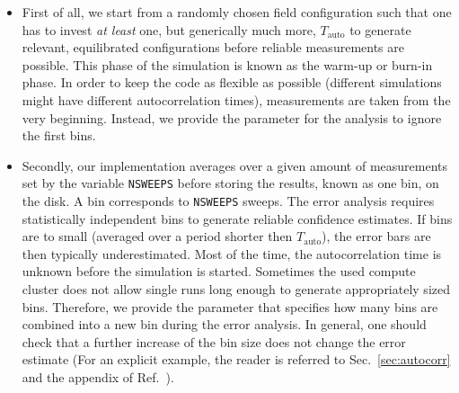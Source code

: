 \documentclass{SciPost}
\begin{document}
\begin{itemize}
	\item First of all, we start from a randomly chosen field configuration such that one has to invest \textit{at least}  one, but generically much more, $T_\mathrm{auto}$ to generate relevant, equilibrated configurations before reliable measurements are possible. This phase of the simulation is known as the warm-up or burn-in phase. In order to keep the code as flexible as possible (different simulations might have different autocorrelation times), measurements are taken from the very beginning. Instead, we provide the parameter  for the analysis to ignore the first  bins.
	\item Secondly, our implementation averages over a given amount of measurements   set by the variable \texttt{NSWEEPS}  before storing the results, known as one bin, on the disk.  A bin corresponds to \texttt{NSWEEPS}  sweeps. The  error analysis requires statistically  independent bins to generate reliable confidence estimates. If bins are to small (averaged over a period shorter then $T_\mathrm{auto}$), the error bars are then typically underestimated. Most of the time, the autocorrelation time is unknown before the simulation is started.  Sometimes the used compute cluster does not allow single runs long enough to generate appropriately sized bins. Therefore, we provide the  parameter that specifies how many bins are combined into a new bin during the error analysis. In general, one should check that a further increase of the bin size does not change the error estimate   (For an explicit example, the reader is referred to Sec.~\ref{sec:autocorr} and the appendix of Ref.~\cite{Assaad02}).


\end{itemize}
\end{document}
